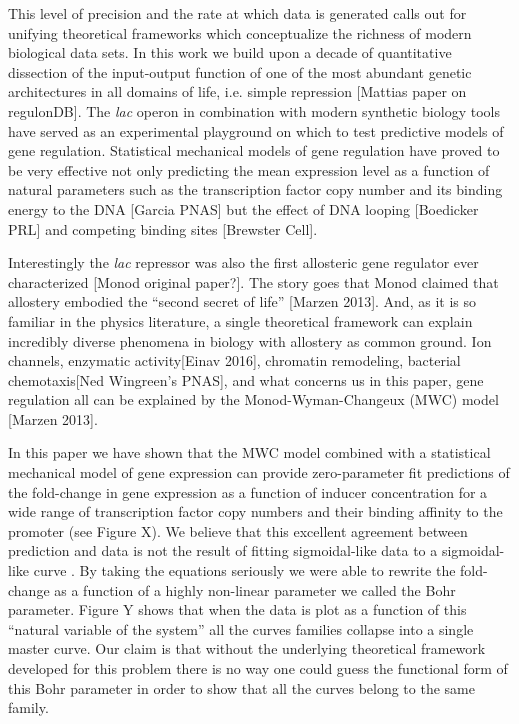 This level of precision and the rate at which data is generated calls out for
unifying theoretical frameworks which conceptualize the richness of modern
biological data sets. In this work we build upon a decade of quantitative
dissection of the input-output function of one of the most abundant genetic
architectures in all domains of life, i.e. simple repression [Mattias paper on
regulonDB]. The \textit{lac} operon in combination with modern synthetic biology
tools have served as an experimental playground on which to test predictive
models of gene regulation. Statistical mechanical models of gene regulation have
proved to be very effective not only predicting the mean expression level as a
function of natural parameters such as the transcription factor copy number and
its binding energy to the DNA [Garcia PNAS] but the effect of DNA looping
[Boedicker PRL] and competing binding sites [Brewster Cell].

Interestingly the \textit{lac} repressor was also the first allosteric gene
regulator ever characterized [Monod original paper?]. The story goes that Monod
claimed that allostery embodied the ``second secret of life'' [Marzen 2013].
And, as it is so familiar in the physics literature, a single theoretical
framework can explain incredibly diverse phenomena in biology with allostery as
common ground. Ion channels, enzymatic activity[Einav 2016], chromatin
remodeling, bacterial chemotaxis[Ned Wingreen's PNAS], and what concerns us in
this paper, gene regulation all can be explained by the Monod-Wyman-Changeux
(MWC) model [Marzen 2013]. 

In this paper we have shown that the MWC model combined with a statistical
mechanical model of gene expression can provide zero-parameter fit predictions
of the fold-change in gene expression as a function of inducer concentration for
a wide range of transcription factor copy numbers and their binding affinity to
the promoter (see Figure X). We believe that this excellent agreement between
prediction and data is not the result of fitting sigmoidal-like data to a
sigmoidal-like curve . By taking the equations seriously we were able to rewrite
the fold-change as a function of a highly non-linear parameter we called the
Bohr parameter. Figure Y shows that when the data is plot as a function of this
``natural variable of the system'' all the curves families collapse into a
single master curve. Our claim is that without the underlying theoretical
framework developed for this problem there is no way one could guess the
functional form of this Bohr parameter in order to show that all the curves
belong to the same family.

